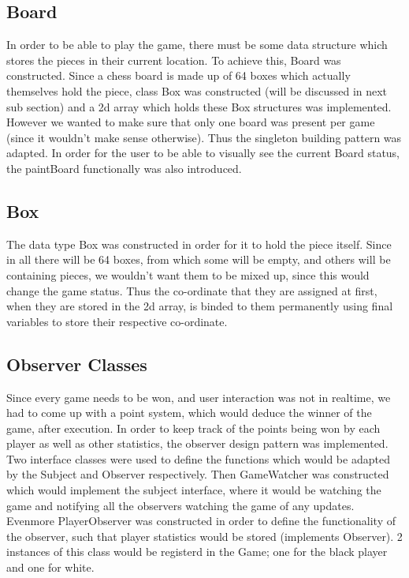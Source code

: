 \documentclass[12pt, A4]{report}
\begin{document}
		\subsection*{Board}
		In order to be able to play the game, there must be some data structure which stores the pieces in their current location. To achieve this, Board was constructed. Since a chess board is made up of 64 boxes which actually themselves hold the piece, class Box was constructed (will be discussed in next sub section) and a 2d array which holds these Box structures was implemented. However we wanted to make sure that only one board was present per game (since it wouldn't make sense otherwise). Thus the singleton building pattern was adapted. In order for the user to be able to visually see the current Board status, the paintBoard functionally was also introduced. 

		\subsection*{Box} 
		The data type Box was constructed in order for it to hold the piece itself. Since in all there will be 64 boxes, from which some will be empty, and others will be containing pieces, we wouldn't want them to be mixed up, since this would change the game status. Thus the co-ordinate that they are assigned at first, when they are stored in the 2d array, is binded to them permanently using final variables to store their respective co-ordinate.
		
		\subsection*{Observer Classes}
		Since every game needs to be won, and user interaction was not in realtime, we had to come up with a point system, which would deduce the winner of the game, after execution. In order to keep track of the points being won by each player as well as other statistics, the observer design pattern was implemented. Two interface classes were used to define the functions which would be adapted by the Subject and Observer respectively. Then GameWatcher was constructed which would implement the subject interface, where it would be watching the game and notifying all the observers watching the game of any updates. Evenmore PlayerObserver was constructed in order to define the functionality of the observer, such that player statistics would be stored (implements Observer). 2 instances of this class would be registerd in the Game; one for the black player and one for white.
\end{document}
